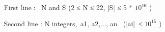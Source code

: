 First line :  N and S (2 ≤ N ≤ 22, |S| ≤ 5 * $10^{16}$ )


Second line : N integers, a1, a2,..., an  (|ai| ≤ $10^{15}$ )